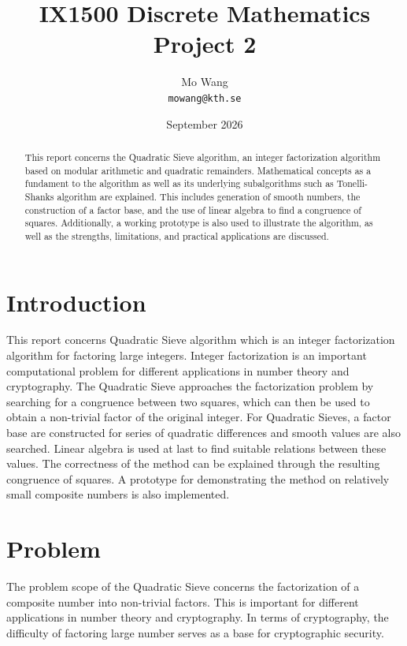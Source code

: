 \documentclass[11pt,a4paper]{article}
\title{
    \textbf{IX1500 Discrete Mathematics}\\
    Project 2
}
\author{
    Mo Wang\\
    \texttt{mowang@kth.se}
}
\date{September 2026}
\begin{document}
\maketitle

\begin{abstract}

This report concerns the Quadratic Sieve algorithm, an integer factorization algorithm based on modular arithmetic and quadratic remainders. Mathematical concepts as a fundament to the algorithm as well as its underlying subalgorithms such as Tonelli-Shanks algorithm are explained. This includes generation of smooth numbers, the construction of a factor base, and the use of linear algebra to find a congruence of squares. Additionally, a working prototype is also used to illustrate the algorithm, as well as the strengths, limitations, and practical applications are discussed.

\end{abstract}

\section*{Introduction}

This report concerns Quadratic Sieve algorithm which is an integer factorization algorithm for factoring large integers. Integer factorization is an important computational problem for different applications in number theory and cryptography. The Quadratic Sieve approaches the factorization problem by searching for a congruence between two squares, which can then be used to obtain a non-trivial factor of the original integer. For Quadratic Sieves, a factor base are constructed for series of quadratic differences and smooth values are also searched. Linear algebra is used at last to find suitable relations between these values. The correctness of the method can be explained through the resulting congruence of squares. A prototype for demonstrating the method on relatively small composite numbers is also implemented.

\section*{Problem}

The problem scope of the Quadratic Sieve concerns the factorization of a composite number into non-trivial factors. This is important for different applications in number theory and cryptography. In terms of cryptography, the difficulty of factoring large number serves as a base for cryptographic security. 
\end{document}
